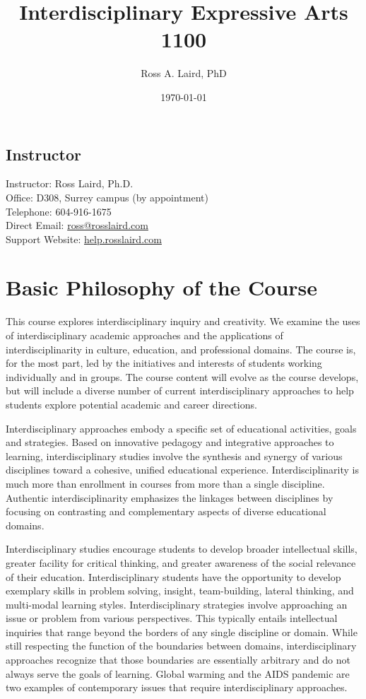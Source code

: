 \documentclass[letterpaper,10pt,headsepline]{scrreprt}
\author{Ross A. Laird, PhD}
\title{Interdisciplinary Expressive Arts 1100}
\date{\today}
\begin{document}
\begin{titlingpage}
\begin{center}
\maketitle
\end{center}
\end{titlingpage}
\tableofcontents
\subsection{Instructor}
Instructor: Ross Laird, Ph.D.\\ 
Office: D308, Surrey campus (by appointment)\\
Telephone: 604-916-1675\\
Direct Email: \url{ross@rosslaird.com}\\
Support Website: \url{help.rosslaird.com}\\

\section{Basic Philosophy of the Course}

This course explores interdisciplinary inquiry and creativity. We examine the uses of interdisciplinary academic approaches and the applications of interdisciplinarity in culture, education, and professional domains. The course is, for the most part, led by the initiatives and interests of students working individually and in groups. The course content will evolve as the course develops, but will include a diverse number of current interdisciplinary approaches to help students explore potential academic and career directions.

Interdisciplinary approaches embody a specific set of educational activities, goals and strategies. Based on innovative pedagogy and integrative approaches to learning, interdisciplinary
studies involve the synthesis and synergy of various disciplines toward a cohesive, unified educational experience. Interdisciplinarity is much more than enrollment in courses from more than a single discipline. Authentic interdisciplinarity emphasizes the linkages between disciplines by focusing on contrasting and complementary aspects of diverse educational domains.

Interdisciplinary studies encourage students to develop broader intellectual skills, greater facility for critical thinking, and greater awareness of the social relevance of their education. Interdisciplinary students have the opportunity to develop exemplary skills in problem solving, insight, team-building, lateral thinking, and multi-modal learning styles. Interdisciplinary strategies involve approaching an issue or problem from various perspectives. This typically entails intellectual inquiries that range beyond the borders of any single discipline or domain. While still respecting the function of the boundaries between domains, interdisciplinary approaches recognize that those boundaries are essentially arbitrary and do not always serve the goals of learning. Global warming and the AIDS pandemic are two examples of contemporary issues that require interdisciplinary approaches.
\end{document}
